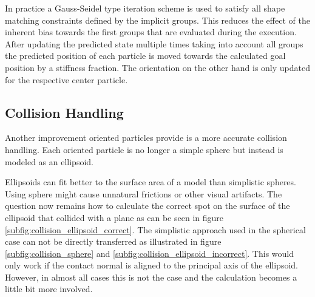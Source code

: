 In practice a Gauss-Seidel type iteration scheme is used to satisfy all shape matching constraints defined by the implicit groups. This reduces the effect of the inherent bias towards the first groups that are evaluated during the execution. After updating the predicted state multiple times taking into account all groups the predicted position of each particle is moved towards the calculated goal position by a stiffness fraction. The orientation on the other hand is only updated for the respective center particle.

\subsection{Collision Handling}
\label{subsec:collision_handling}

Another improvement oriented particles provide is a more accurate collision handling. Each oriented particle is no longer a simple sphere but instead is modeled as an ellipsoid.

\begin{figure}[htbp]
  \centering
  \label{fig:collision_handling}
\end{figure}

Ellipsoids can fit better to the surface area of a model than simplistic spheres. Using sphere might cause unnatural frictions or other visual artifacts. The question now remains how to calculate the correct spot on the surface of the ellipsoid that collided with a plane as can be seen in figure \ref{subfig:collision_ellipsoid_correct}. The simplistic approach used in the spherical case can not be directly transferred as illustrated in figure \ref{subfig:collision_sphere} and \ref{subfig:collision_ellipsoid_incorrect}. This would only work if the contact normal is aligned to the principal axis of the ellipsoid. However, in almost all cases this is not the case and the calculation becomes a little bit more involved.

